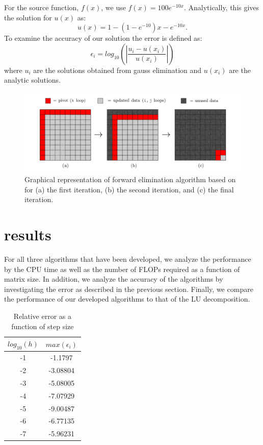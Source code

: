 \documentclass[prc,amsmath,twocolumn,superscriptaddress]{revtex4}
\begin{document}
For the source function, $f(x)$, we use $f(x)=100e^{-10x}$. Analytically, this gives the solution for $u(x)$ as:
\begin{equation}
u(x)=1-(1-e^{-10})x-e^{-10x}.
\end{equation}
To examine the accuracy of our solution the error is defined as:
\begin{equation}
\epsilon_i=log_10\left(\left|\frac{u_i-u(x_i)}{u(x_i)}\right|\right)
\end{equation}
where $u_i$ are the solutions obtained from gauss elimination and $u(x_i)$ are the analytic solutions.

\begin{figure}[t]
\includegraphics[scale=0.2]{algorithm.jpg}
\caption{Graphical representation of forward elimination algorithm based on~\cite{graph} for (a) the first iteration, (b) the second iteration, and (c) the final iteration.}
\label{algorithm}
\end{figure}

\section{results}
\label{results}
For all three algorithms that have been developed, we analyze the performance by the CPU time as well as the number of FLOPs required as a function of matrix size. In addition, we analyze the accuracy of the algorithms by investigating the error as described in the previous section. Finally, we compare the performance of our developed algorithms to that of the LU decomposition.


\begin{table}[h]
\centering
\begin{tabular}{|c|c|}
\hline
$log_{10}(h)$ & $max(\epsilon_i)$\\
\hline
-1&-1.1797\\
-2&-3.08804\\
-3&-5.08005\\
-4&-7.07929\\
-5&-9.00487\\
-6&-6.77135\\
-7&-5.96231\\
\hline
\end{tabular}
\caption{Relative error as a function of step size}
\label{err_table}
\end{table}
\end{document}
